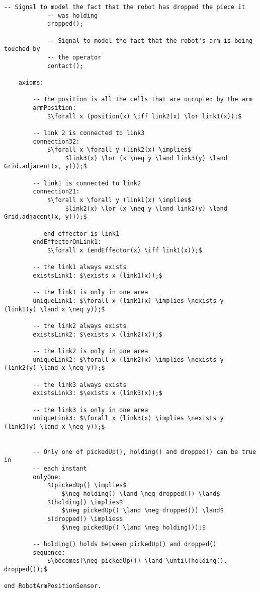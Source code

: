 \begin{lstlisting}[fontadjust, mathescape, frame=single]
            -- Signal to model the fact that the robot has dropped the piece it
            -- was holding
            dropped();

            -- Signal to model the fact that the robot's arm is being touched by
            -- the operator
            contact();

    axioms:

        -- The position is all the cells that are occupied by the arm
        armPosition: 
            $\forall x (position(x) \iff link2(x) \lor link1(x));$
        
        -- link 2 is connected to link3
        connection32: 
            $\forall x \forall y (link2(x) \implies$
                 $link3(x) \lor (x \neq y \land link3(y) \land Grid.adjacent(x, y)));$

        -- link1 is connected to link2
        connection21: 
            $\forall x \forall y (link1(x) \implies$ 
                 $link2(x) \lor (x \neq y \land link2(y) \land Grid.adjacent(x, y)));$

        -- end effector is link1
        endEffectorOnLink1:
            $\forall x (endEffector(x) \iff link1(x));$

        -- the link1 always exists
        existsLink1: $\exists x (link1(x));$

        -- the link1 is only in one area
        uniqueLink1: $\forall x (link1(x) \implies \nexists y (link1(y) \land x \neq y));$
        
        -- the link2 always exists
        existsLink2: $\exists x (link2(x));$

        -- the link2 is only in one area
        uniqueLink2: $\forall x (link2(x) \implies \nexists y (link2(y) \land x \neq y));$

        -- the link3 always exists
        existsLink3: $\exists x (link3(x));$

        -- the link3 is only in one area
        uniqueLink3: $\forall x (link3(x) \implies \nexists y (link3(y) \land x \neq y));$    


        -- Only one of pickedUp(), holding() and dropped() can be true in 
        -- each instant
        onlyOne:
            $(pickedUp() \implies$
                $\neg holding() \land \neg dropped()) \land$
            $(holding() \implies$ 
                $\neg pickedUp() \land \neg dropped()) \land$
            $(dropped() \implies$
                $\neg pickedUp() \land \neg holding());$

        -- holding() holds between pickedUp() and dropped()
        sequence:
            $\becomes(\neg pickedUp()) \land \until(holding(), dropped());$

end RobotArmPositionSensor.
\end{lstlisting}